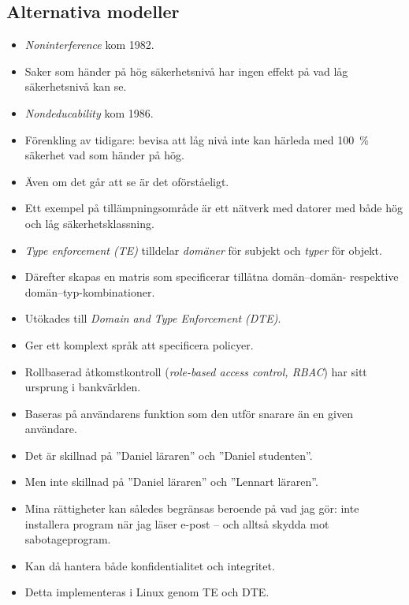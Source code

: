 \subsection{Alternativa modeller}
\begin{frame}{\insertsubsectionhead}
  \begin{itemize}
    \item \emph{Noninterference} kom 1982.
    \item Saker som händer på hög säkerhetsnivå har ingen effekt på vad låg 
      säkerhetsnivå kan se.
    \item \emph{Nondeducability} kom 1986.
    \item Förenkling av tidigare: bevisa att låg nivå inte kan härleda med 
      \SI{100}{\%} säkerhet vad som händer på hög.
    \item Även om det går att se är det oförståeligt.
    \item Ett exempel på tillämpningsområde är ett nätverk med datorer med både 
      hög och låg säkerhetsklassning.
  \end{itemize}
\end{frame}
\begin{frame}{\insertsubsectionhead}
  \begin{itemize}
    \item \emph{Type enforcement (TE)} tilldelar \emph{domäner} för subjekt och 
      \emph{typer} för objekt.
    \item Därefter skapas en matris som specificerar tillåtna domän--domän- 
      respektive domän--typ-kombinationer.
    \item Utökades till \emph{Domain and Type Enforcement (DTE)}.
    \item Ger ett komplext språk att specificera policyer.
  \end{itemize}
\end{frame}
\begin{frame}{\insertsubsectionhead}
  \begin{itemize}
    \item Rollbaserad åtkomstkontroll (\emph{role-based access control, RBAC}) 
      har sitt ursprung i bankvärlden.
    \item Baseras på användarens funktion som den utför snarare än en given 
      användare.
    \item Det är skillnad på ''Daniel läraren'' och ''Daniel studenten''.
    \item Men inte skillnad på ''Daniel läraren'' och ''Lennart läraren''.
    \item Mina rättigheter kan således begränsas beroende på vad jag gör: inte 
      installera program när jag läser e-post -- och alltså skydda mot 
      sabotageprogram.
    \item Kan då hantera både konfidentialitet och integritet.
    \item Detta implementeras i Linux genom TE och DTE.
  \end{itemize}
\end{frame}
